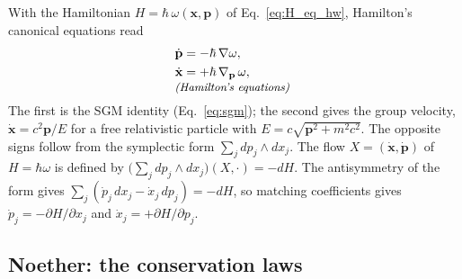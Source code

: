 \documentclass[aps,prd,onecolumn,tightenlines,nofootinbib,notitlepage,11pt,floatfix]{revtex4-2}
\theoremstyle{indentedtheorem}
\begin{document}
With the Hamiltonian $H=\hbar \, \omega(\mathbf{x},\mathbf{p})$ of Eq.~\eqref{eq:H_eq_hw}, Hamilton's canonical equations read
\begin{align}
    \dot{\mathbf{p}} &= -\hbar\,\nabla\omega , \label{eq:ham_p}\\
    \dot{\mathbf{x}} &= +\hbar\,\nabla_{\mathbf{p}}\,\omega , \label{eq:ham_x} \\[-3pt]
    \multispan2{\hfil\text{\small\itshape (Hamilton's equations)}\hfil} \notag
\end{align}
The first is the SGM identity (Eq.~\eqref{eq:sgm}); the second gives the group velocity, $\dot{\mathbf{x}}=c^2\mathbf{p}/E$ for a free relativistic particle with $E=c\sqrt{\mathbf{p}^2+m^2c^2}$. The opposite signs follow from the symplectic form $\sum_j dp_j\wedge dx_j$. The flow $X=(\dot{\mathbf{x}},\dot{\mathbf{p}})$ of $H=\hbar\omega$ is defined by $\big(\sum_j dp_j\wedge dx_j\big)(X,\cdot)=-dH$. The antisymmetry of the form gives $\sum_j(\dot{p}_j\,dx_j-\dot{x}_j\,dp_j)=-dH$, so matching coefficients gives $\dot{p}_j=-\partial H/\partial x_j$ and $\dot{x}_j=+\partial H/\partial p_j$.

\subsection{Noether: the conservation laws}
\label{sec:conservation}
\end{document}
